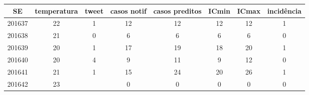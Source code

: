 \begin{tabular}{c|ccccccc}
  \hline
SE & temperatura & tweet & casos notif & casos preditos & ICmin & ICmax & incidência \\ 
  \hline
201637 & 22 & 1 & 12 & 12 & 12 & 12 & 1 \\ 
  201638 & 21 & 0 & 6 & 6 & 6 & 6 & 0 \\ 
  201639 & 20 & 1 & 17 & 19 & 18 & 20 & 1 \\ 
  201640 & 20 & 4 & 9 & 11 & 9 & 12 & 0 \\ 
  201641 & 21 & 1 & 15 & 24 & 20 & 26 & 1 \\ 
  201642 & 23 &  & 0 & 0 & 0 & 0 & 0 \\ 
   \hline
\end{tabular}
